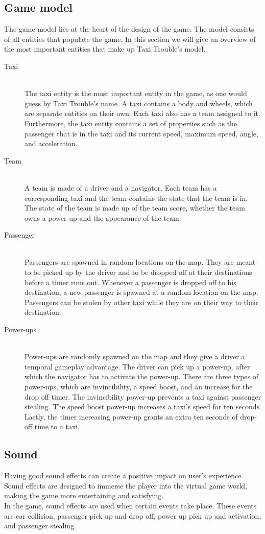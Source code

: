 \subsection*{Game model}
	The game model lies at the heart of the design of the game. The model consists of all entities that populate the game. In this section we will give an overview of the most important entities that make up Taxi Trouble's model.

\begin{description}
	\item[Taxi] \hfill \\
	 The taxi entity is the most important entity in the game, as one would guess by Taxi Trouble's name. A taxi contains a body and wheels, which are separate entities on their own. Each taxi also has a team assigned to it. Furthermore, the taxi entity contains a set of properties such as the passenger that is in the taxi and its current speed, maximum speed, angle, and acceleration.
	\item[Team] \hfill \\
	A team is made of a driver and a navigator. Each team has a corresponding taxi and the team contains the state that the team is in. The state of the team is made up of the team score, whether the team owns a power-up and the appearance of the team.
	\item[Passenger] \hfill \\
	Passengers are spawned in random locations on the map. They are meant to be picked up by the driver and to be dropped off at their destinations before a timer runs out. Whenever a passenger is dropped off to his destination, a new passenger is spawned at a random location on the map. Passengers can be stolen by other taxi while they are on their way to their destination.		
	\item[Power-ups] \hfill \\
	Power-ups are randomly spawned on the map and they give a driver a temporal gameplay advantage. The driver can pick up a power-up, after which the navigator has to activate the power-up. There are three types of power-ups, which are invincibility, a speed boost, and an increase for the drop off timer. The invincibility power-up prevents a taxi against passenger stealing. The speed boost power-up increases a taxi's speed for ten seconds. Lastly, the timer increasing power-up grants an extra ten seconds of drop-off time to a taxi.
\end{description}	

\subsection*{Sound}
	Having good sound effects can create a positive impact on user's experience. Sound effects are designed to immerse the player into the virtual game world, making the game more entertaining and satisfying.\\
	In the game, sound effects are used when certain events take place. These events are car collision, passenger pick up and drop off, power up pick up and activation, and passenger stealing.



